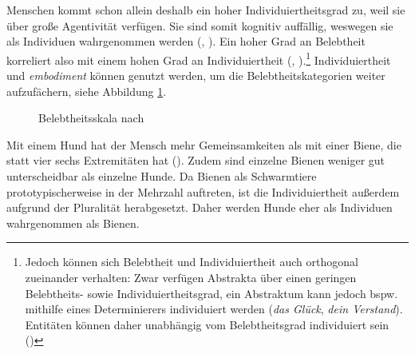 \begin{sloppypar}
Menschen kommt schon allein deshalb ein hoher Individuiertheitsgrad zu, weil sie über große Agentivität verfügen. Sie sind somit kognitiv auffällig, weswegen sie als Individuen wahrgenommen werden (\cite[71]{Epstein.1994}, \cite[104]{Flick.2020}). Ein hoher Grad an Belebtheit korreliert also mit einem hohen Grad an Individuiertheit (\cite[345]{Szczepaniak.2011}, \cite[104]{Flick.2020}).\footnote{Jedoch können sich Belebtheit und Individuiertheit auch orthogonal zueinander verhalten: Zwar verfügen Abstrakta über einen geringen Belebtheits- sowie Individuiertheitsgrad, ein Abstraktum kann jedoch bspw. mithilfe eines Determinierers individuiert werden (\textit{das Glück}, \textit{dein Verstand}). Entitäten können daher unabhängig vom Belebtheitsgrad individuiert sein (\cite[111]{Flick.2020})} Individuiertheit und \textit{embodiment} können genutzt werden, um die Belebtheitskategorien weiter aufzufächern, siehe Abbildung \ref{fig2l}. 
\end{sloppypar}

\begin{figure}
\caption{Belebtheitsskala nach \textcite[115]{Kopcke.2000}}
\label{fig2l}
\end{figure}

Mit einem Hund hat der Mensch mehr Gemeinsamkeiten als mit einer Biene, die statt vier sechs Extremitäten hat (\cite[94]{Flick.2020}). Zudem sind einzelne Bienen weniger gut unterscheidbar als einzelne Hunde. Da Bienen als Schwarmtiere prototypischerweise in der Mehrzahl auftreten, ist die Individuiertheit außerdem aufgrund der Pluralität herabgesetzt. Daher werden Hunde eher als Individuen wahrgenommen als Bienen. 

